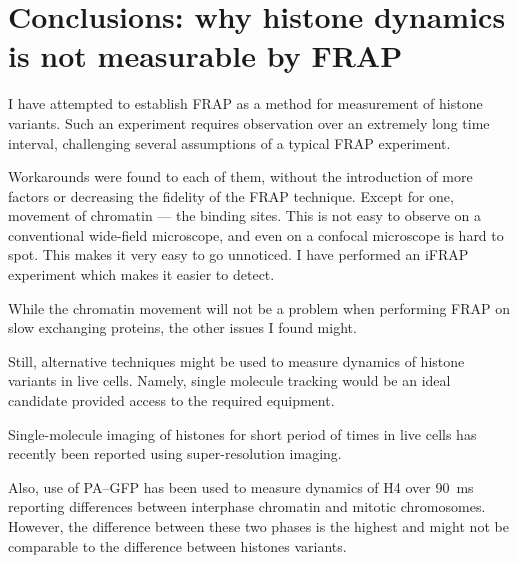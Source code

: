 
\section{Conclusions: why histone dynamics is not measurable by FRAP}
  
  I have attempted to establish FRAP as a method for measurement of histone variants. Such
  an experiment requires observation over an extremely long time interval, challenging several
  assumptions of a typical FRAP experiment.
  
  Workarounds were found to each of them, without the introduction of more factors or decreasing
  the fidelity of the FRAP technique. Except for one, movement of chromatin --- the binding sites.
  This is not easy to observe on a conventional wide-field microscope, and even on a confocal
  microscope is hard to spot. This makes it very easy to go unnoticed. I have performed an iFRAP
  experiment which makes it easier to detect.
  
  While the chromatin movement will not be a problem when performing FRAP on slow exchanging
  proteins, the other issues I found might.
  
  
  Still, alternative techniques might be used to measure dynamics of histone variants in
  live cells. Namely, single molecule tracking would be an ideal candidate provided access
  to the required equipment.
  
  
  Single-molecule imaging of histones for short period of times in live cells
  has recently been reported using super-resolution imaging.
   
  Also, use of PA--GFP has been used to measure dynamics of H4 over \SI{90}{\ms} reporting
  differences between interphase chromatin and mitotic chromosomes.
  However, the difference between these two phases is the highest and might not be comparable to
  the difference between histones variants.
  
